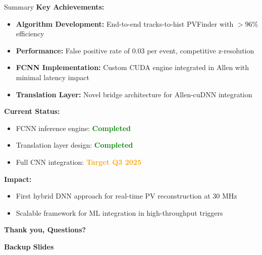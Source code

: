 \documentclass[10pt,aspectratio=169]{beamer}
\begin{document}
\begin{frame}{Summary}
  \textbf{Key Achievements:}
  \begin{itemize}
    \item \textbf{Algorithm Development:} End-to-end tracks-to-hist PVFinder with $>96\%$ efficiency
    \item \textbf{Performance:} False positive rate of 0.03 per event, competitive z-resolution
    \item \textbf{FCNN Implementation:} Custom CUDA engine integrated in Allen with minimal latency impact
    \item \textbf{Translation Layer:} Novel bridge architecture for Allen-cuDNN integration
  \end{itemize}

  \vspace{0.1cm}
  \textbf{Current Status:}
  \begin{itemize}
    \item FCNN inference engine: \textcolor{green}{\textbf{Completed}}
    \item Translation layer design: \textcolor{green}{\textbf{Completed}}  
    \item Full CNN integration: \textcolor{orange}{\textbf{Target Q3 2025}}
  \end{itemize}

  \vspace{0.1cm}
  \textbf{Impact:}
  \begin{itemize}
    \item First hybrid DNN approach for real-time PV reconstruction at 30 MHz
    \item Scalable framework for ML integration in high-throughput triggers
  \end{itemize}
\end{frame}

\begin{frame}[plain]
  \begin{center}
    \vspace{2cm}
    {\Huge\bfseries Thank you, Questions?}
    \vspace{2cm}
  \end{center}
\end{frame}



\begin{frame}[plain]
  \begin{center}
    \vspace{2cm}
    {\Huge\bfseries Backup Slides}
    \vspace{2cm}
  \end{center}
\end{frame}
\end{document}
